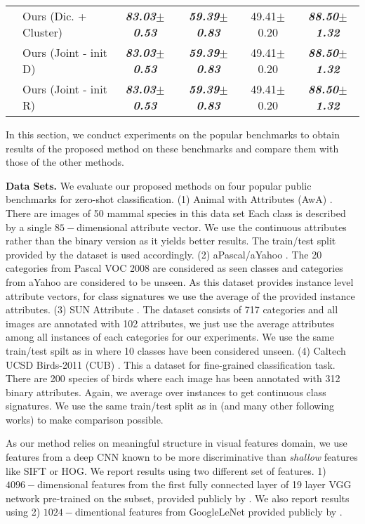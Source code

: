 \documentclass[10pt,twocolumn,letterpaper]{article}
\begin{document}
\begin{table*}[ht]
\begin{minipage}{\textwidth}
\begin{tabular}{|l|l|c|c|c|c|}
& Ours (Dic. + Cluster)                     & \textbf{\em 83.03$\pm$0.53}  & \textbf{\em 59.39$\pm$0.83} & 49.41$\pm$0.20 & \textbf{\em 88.50$\pm$1.32} \\
& Ours (Joint - init D)                     & \textbf{\em 83.03$\pm$0.53}  & \textbf{\em 59.39$\pm$0.83} & 49.41$\pm$0.20 & \textbf{\em 88.50$\pm$1.32} \\
& Ours (Joint - init R)                     & \textbf{\em 83.03$\pm$0.53}  & \textbf{\em 59.39$\pm$0.83} & 49.41$\pm$0.20 & \textbf{\em 88.50$\pm$1.32} \\
\hline
\end{tabular}
\end{minipage}\vspace{-3mm}
\end{table*}
In this section, we conduct experiments on the popular benchmarks to obtain results of the proposed method on these benchmarks and compare them with those of the other methods.

\textbf{Data Sets.}
We evaluate our proposed methods on four popular public benchmarks for zero-shot classification.
(1) Animal with Attributes (AwA) \cite{lampert09}. There are images of 50 mammal species in this data set
Each class is described by a single $85-$dimensional attribute vector. We use the continuous attributes rather than
the binary version as it yields better results. The train/test split provided by the dataset is used accordingly.
(2) aPascal/aYahoo \cite{farhadi09}. The 20 categories from Pascal VOC 2008 \cite{pascal} are considered as seen classes and
categories from aYahoo are considered to be unseen. As this dataset provides instance level attribute vectors,
for class signatures we use the average of the provided instance attributes.
(3) SUN Attribute \cite{sun}. The dataset consists of 717 categories and all images are annotated with 102 attributes, we just
use the average attributes among all instances of each categories for our experiments. We use the same train/test spilt
as in \cite{jayaraman14} where 10 classes have been considered unseen.
(4) Caltech UCSD Birds-2011 (CUB) \cite{cub}. This a dataset for fine-grained classification task. There are 200 species of
birds where each image has been annotated with 312 binary attributes. Again, we average over instances to get continuous class signatures.
We use the same train/test split as in \cite{akata13} (and many other following works) to make comparison possible.

As our method relies on meaningful structure in visual features domain, we use features from a deep CNN known to
be more discriminative than \textit{shallow} features like SIFT or HOG. We report results using two different set of features.
1) $4096-$dimensional features from the first fully connected layer of 19 layer VGG network \cite{vgg}
pre-trained on the subset, provided publicly by \cite{sse}. We also report results using
2) $1024-$dimentional features from GoogleLeNet \cite{googlenet} provided publicly by \cite{Akata2015}.
\end{document}

